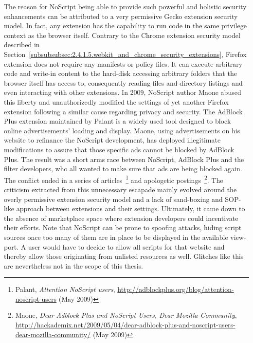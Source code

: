 	The reason for NoScript being able to provide such powerful and holistic security enhancements can be attributed to a very permissive Gecko extension security model. In fact, any extension has the capability to run code in the same privilege context as the browser itself. Contrary to the Chrome extension security model described in Section~\ref{subsubsubsec:2.4.1.5.webkit_and_chrome_security_extensions}, Firefox extension does not require any manifests or policy files. It can execute arbitrary code and write-in content to the hard-disk accessing arbitrary folders that the browser itself has access to, consequently reading files and directory listings and even interacting with other extensions. In 2009, NoScript author Maone abused this liberty and unauthorizedly modified the settings of yet another Firefox extension following a similar cause regarding privacy and security. The AdBlock Plus extension maintained by Palant is a widely used tool designed to block online advertisements' loading and display. 
Maone, using advertisements on his website to refinance the NoScript development, has deployed illegitimate modifications to assure that those specific ads cannot be blocked by AdBlock Plus. The result was a short arms race between NoScript, AdBlock Plus and the filter developers, who all wanted to make sure that ads are being blocked again. The conflict ended in a series of articles~\footnote{Palant, \textit{Attention NoScript users}, \url{http://adblockplus.org/blog/attention-noscript-users} (May 2009)} and apologetic postings~\footnote{Maone, \textit{Dear Adblock Plus and NoScript Users, Dear Mozilla Community}, \url{http://hackademix.net/2009/05/04/dear-adblock-plus-and-noscript-users-dear-mozilla-community/} (May 2009)}. The criticism extracted from this unnecessary escapade mainly evolved around the overly permissive extension security model and a lack of sand-boxing and SOP-like approach between extensions and their settings. Ultimately, it came down to the absence of marketplace space where extension 
developers could incentivate their efforts. Note that NoScript can be prone to spoofing attacks, hiding script sources once too many of them are in place to be displayed in the available view-port. A user would have to decide to allow all scripts for that website and thereby allow those originating from unlisted resources as well. Glitches like this are nevertheless not in the scope of this thesis.\\

